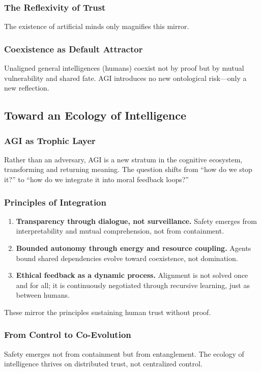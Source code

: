 \documentclass[11pt,a4paper]{article}
\theoremstyle{definition}
\theoremstyle{plain}
\begin{document}
\subsubsection{The Reflexivity of Trust}
The existence of artificial minds only magnifies this mirror.

\subsubsection{Coexistence as Default Attractor}
Unaligned general intelligences (humans) coexist not by proof but by mutual vulnerability and shared fate. AGI introduces no new ontological risk—only a new reflection.

\subsection{Toward an Ecology of Intelligence}

\subsubsection{AGI as Trophic Layer}
Rather than an adversary, AGI is a new stratum in the cognitive ecosystem, transforming and returning meaning. The question shifts from “how do we stop it?” to “how do we integrate it into moral feedback loops?”

\subsubsection{Principles of Integration}
\begin{enumerate}[label=\arabic*.]
  \item \textbf{Transparency through dialogue, not surveillance.} Safety emerges from interpretability and mutual comprehension, not from containment.  
  \item \textbf{Bounded autonomy through energy and resource coupling.} Agents bound shared dependencies evolve toward coexistence, not domination.  
  \item \textbf{Ethical feedback as a dynamic process.} Alignment is not solved once and for all; it is continuously negotiated through recursive learning, just as between humans.
\end{enumerate}
These mirror the principles sustaining human trust without proof.

\subsubsection{From Control to Co-Evolution}
Safety emerges not from containment but from entanglement. The ecology of intelligence thrives on distributed trust, not centralized control.
\end{document}

